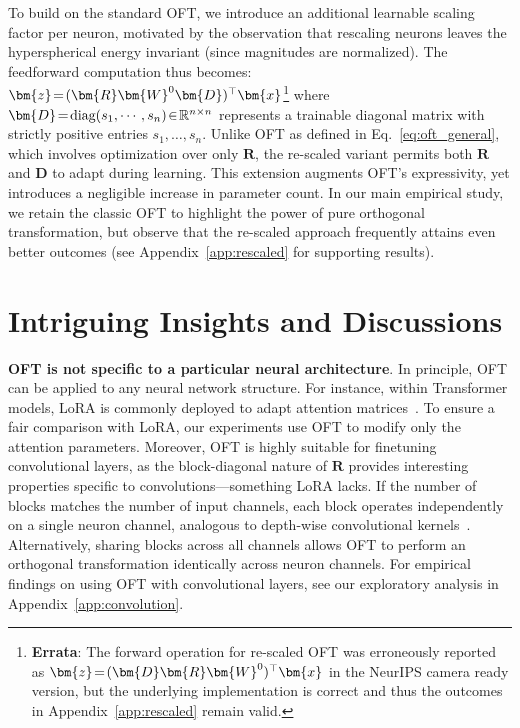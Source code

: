 To build on the standard OFT, we introduce an additional learnable scaling factor per neuron, motivated by the observation that rescaling neurons leaves the hyperspherical energy invariant (since magnitudes are normalized). The feedforward computation thus becomes: $\thickmuskip=2mu \medmuskip=2mu\bm{z}=(\bm{R}\bm{W}^0\bm{D})^\top\bm{x}$\footnote{\textbf{Errata}: The forward operation for re-scaled OFT was erroneously reported as $\thickmuskip=2mu \medmuskip=2mu\bm{z}=(\bm{D}\bm{R}\bm{W}^0)^\top\bm{x}$ in the NeurIPS camera ready version, but the underlying implementation is correct and thus the outcomes in Appendix~\ref{app:rescaled} remain valid.} where $\thickmuskip=2mu \medmuskip=2mu \bm{D}=\text{diag}(s_1,\cdots,s_n)\in\mathbb{R}^{n\times n}$ represents a trainable diagonal matrix with strictly positive entries $s_1,\ldots,s_n$. Unlike OFT as defined in Eq.~\eqref{eq:oft_general}, which involves optimization over only $\bm{R}$, the re-scaled variant permits both $\bm{R}$ and $\bm{D}$ to adapt during learning. This extension augments OFT’s expressivity, yet introduces a negligible increase in parameter count. In our main empirical study, we retain the classic OFT to highlight the power of pure orthogonal transformation, but observe that the re-scaled approach frequently attains even better outcomes (see Appendix~\ref{app:rescaled} for supporting results).

\section{Intriguing Insights and Discussions}

\textbf{OFT is not specific to a particular neural architecture}. In principle, OFT can be applied to any neural network structure. For instance, within Transformer models, LoRA is commonly deployed to adapt attention matrices~\cite{hulora2022}. To ensure a fair comparison with LoRA, our experiments use OFT to modify only the attention parameters. Moreover, OFT is highly suitable for finetuning convolutional layers, as the block-diagonal nature of $\bm{R}$ provides interesting properties specific to convolutions—something LoRA lacks. If the number of blocks matches the number of input channels, each block operates independently on a single neuron channel, analogous to depth-wise convolutional kernels~\cite{chollet2017xception}. Alternatively, sharing blocks across all channels allows OFT to perform an orthogonal transformation identically across neuron channels. For empirical findings on using OFT with convolutional layers, see our exploratory analysis in Appendix~\ref{app:convolution}.

